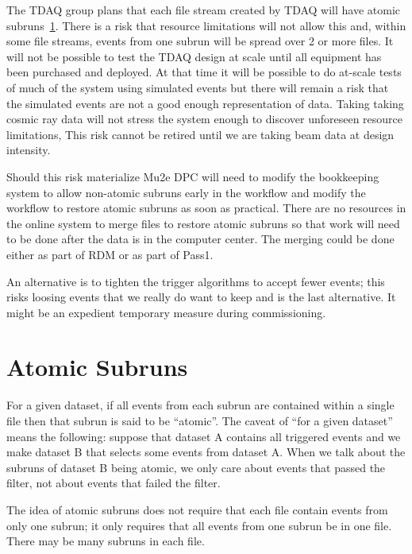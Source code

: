 The TDAQ group plans that each file stream created by TDAQ will have atomic subruns~\ref{ch:AtomicSubrunsExtendedDefinition}.
There is a risk that resource limitations will not allow this and, within some file streams,
events from one subrun will be spread over 2 or more files.  It will not be possible
to test the TDAQ design at scale until all equipment has been purchased and deployed.
At that time it will be possible to do at-scale tests of much of the system using simulated events
but there will remain a risk that the simulated events are not a good enough representation of data.
Taking taking cosmic ray data will not stress the system enough to discover unforeseen resource limitations,
This risk cannot be retired until we are taking beam data at design intensity.

Should this risk materialize Mu2e DPC will need to modify the bookkeeping
system to allow non-atomic subruns early in the workflow and modify the workflow
to restore atomic subruns as soon as practical.
There are no resources in the online system to merge files to restore atomic subruns
so that work will need to be done after the data is in the computer center.
The merging could be done either as part of RDM or as part of Pass1.

An alternative is to tighten the trigger algorithms to accept fewer events;
this risks loosing events that we really do want to keep and is the last alternative.
It might be an expedient temporary measure during commissioning.


\appendix

\chapter{Atomic Subruns}
\label{ch:AtomicSubrunsExtendedDefinition}

For a given dataset, if all events from each subrun are contained within a single \art file
then that subrun is said to be ``atomic''.
The caveat of ``for a given dataset'' means the following:
suppose that dataset A contains all triggered events
and we make dataset B that selects some events from dataset A.
When we talk about the subruns of dataset B being atomic, we only care about events
that passed the filter, not about events that failed the filter.

The idea of atomic subruns does not require that each file contain events
from only one subrun;
it only requires that all events from one subrun be in one file.
There may be many subruns in each file.

